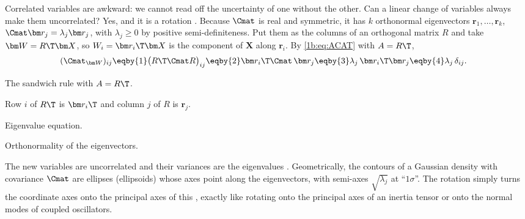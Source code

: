 Correlated variables are awkward: we cannot read off the uncertainty of one
without the other. Can a linear change of variables always make them
uncorrelated? Yes, and it is a rotation . Because $\Cmat$
is real and symmetric, it has $k$ orthonormal eigenvectors $\bm r_1,\dots,\bm r_k$,
$\Cmat\bm r_j=\lambda_j\bm r_j$, with $\lambda_j\ge0$ by positive
semi-definiteness. Put them as the columns of an orthogonal matrix $R$ and
take $\bm W=R\T\bm X$, so $W_i=\bm r_i\T\bm X$ is the component of $\bm X$ along
$\bm r_i$. By \eqref{1b:eq:ACAT} with $A=R\T$,
\begin{align*}
  (\Cmat_{\bm W})_{ij}
  &\eqby{1} \bigl(R\T\Cmat R\bigr)_{ij}
   \eqby{2} \bm r_i\T\Cmat\,\bm r_j
   \eqby{3} \lambda_j\,\bm r_i\T\bm r_j
   \eqby{4} \lambda_j\,\delta_{ij} .
\end{align*}
\begin{explain}
  \item The sandwich rule with $A=R\T$.
  \item Row $i$ of $R\T$ is $\bm r_i\T$ and column $j$ of $R$ is $\bm r_j$.
  \item Eigenvalue equation.
  \item Orthonormality of the eigenvectors.
\end{explain}
The new variables are uncorrelated and their variances are the eigenvalues
. Geometrically, the contours of a Gaussian density with
covariance $\Cmat$ are ellipses (ellipsoids) whose axes point along the
eigenvectors, with semi-axes $\sqrt{\lambda_j}$ at ``$1\sigma$''. The rotation
simply turns the coordinate axes onto the principal axes of this
, exactly like rotating onto the principal axes of an
inertia tensor or onto the normal modes of coupled oscillators.

